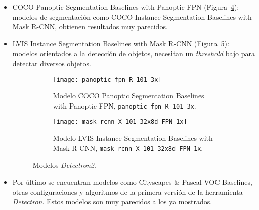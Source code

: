 {\begin{itemize}
	\begin{figure}[ht]
		\begin{subfigure}{.5\textwidth}
			\centering
			\texttt{[image: mask\_rcnn\_R\_50\_DC5\_3x]}
			\caption{Modelo COCO Instance Segmentation Baselines with Mask R-CNN, \texttt{mask\_rcnn\_R\_50\_DC5\_3x}.}
			\label{fig:mask_rcnn_R_50_DC5_3x}
		\end{subfigure}
		\begin{subfigure}{.5\textwidth}
			\centering
			\texttt{[image: keypoint\_rcnn\_R\_101\_FPN\_3x]}
			\caption{Modelo COCO Person Keypoint Detection Baselines with Keypoint R-CNN, \texttt{keypoint\_rcnn\_R\_101\_FPN\_3x}.}
			\label{fig:keypoint_rcnn_R_101_FPN_3x}
		\end{subfigure}
		\caption{Modelos \textit{Detectron2}.}
		\label{fig:m2}
	\end{figure}
	\item COCO Panoptic Segmentation Baselines with Panoptic FPN (Figura~\ref{fig:panoptic_fpn_R_101_3x}): modelos de segmentación como COCO Instance Segmentation Baselines with Mask R-CNN, obtienen resultados muy parecidos.

	\item LVIS Instance Segmentation Baselines with Mask R-CNN (Figura~\ref{fig:mask_rcnn_X_101_32x8d_FPN_1x}): modelos orientados a la detección de objetos, necesitan un \textit{threshold} bajo para detectar diversos objetos.

	\begin{figure}[ht]
		\begin{subfigure}{.5\textwidth}
			\centering
			\texttt{[image: panoptic\_fpn\_R\_101\_3x]}
			\caption{Modelo COCO Panoptic Segmentation Baselines with Panoptic FPN, \texttt{panoptic\_fpn\_R\_101\_3x}.}
			\label{fig:panoptic_fpn_R_101_3x}
		\end{subfigure}
		\begin{subfigure}{.5\textwidth}
			\centering
			\texttt{[image: mask\_rcnn\_X\_101\_32x8d\_FPN\_1x]}
			\caption{Modelo LVIS Instance Segmentation Baselines with Mask R-CNN, \texttt{mask\_rcnn\_X\_101\_32x8d\_FPN\_1x}.}
			\label{fig:mask_rcnn_X_101_32x8d_FPN_1x}
		\end{subfigure}
		\caption{Modelos \textit{Detectron2}.}
		\label{fig:m3}
	\end{figure}
	\item Por último se encuentran modelos como Cityscapes \& Pascal VOC Baselines, otras configuraciones y algoritmos de la primera versión de la herramienta \textit{Detectron}. Estos modelos son muy parecidos a los ya mostrados.
\end{itemize}

}
